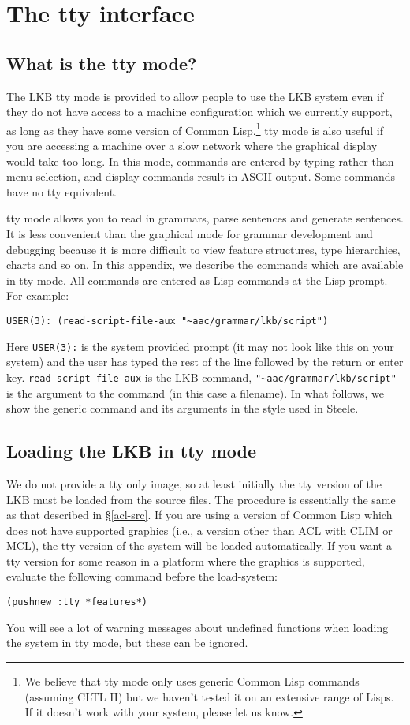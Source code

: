 \documentclass[12pt]{report}
\begin{document}
\appendix
\chapter{The tty interface}
\label{tty}

\section{What is the tty mode?}

The LKB tty mode is provided to allow people to use the LKB system
even if they do not have access to a machine configuration which we
currently support,
as long as they have some version of Common Lisp.\footnote{We
believe that tty mode only uses generic Common Lisp commands (assuming
CLTL II) but we haven't tested it on an extensive range of Lisps.
If it doesn't work with your system, please let us know.}
tty mode is also useful if you are accessing a machine over a slow network
where the graphical display would take too long.
In this mode, commands are entered by typing rather than menu selection,
and display commands result in ASCII output.  Some commands
have no tty equivalent.

tty mode allows you to read in grammars, parse sentences
and generate sentences.  It is less convenient than the graphical
mode for grammar development and debugging because it is more difficult
to view feature structures, type hierarchies, charts and so on.
In this appendix, we describe the commands which are available in tty mode.
All commands are entered as Lisp
commands at the Lisp prompt.
For example:
\begin{verbatim}
USER(3): (read-script-file-aux "~aac/grammar/lkb/script")
\end{verbatim}
Here \verb+USER(3):+ is the system provided prompt (it may not look like
this on your system) and the user has typed the rest of the line
followed by the return or enter key.  \verb+read-script-file-aux+
is the LKB command, \verb+"~aac/grammar/lkb/script"+ is the argument to
the command (in this case a filename).
In what follows, we show the generic command and
its arguments in the style used in Steele.

\section{Loading the LKB in tty mode}

We do not provide a tty only image, so at least initially the tty
version of the LKB must be loaded from the source files.
The procedure is essentially the same as that described in \S\ref{acl-src}.
If you are using a version of Common Lisp which does not have supported
graphics (i.e., a version other than ACL with CLIM or MCL), the
tty version of the system will be loaded automatically.  If you
want a tty version for some reason in a platform where the graphics 
is supported, evaluate the following command before the load-system:
\begin{verbatim}
(pushnew :tty *features*)
\end{verbatim}
You will see a lot of warning messages about undefined functions 
when loading the system in tty mode, but these can be ignored.
\end{document}
